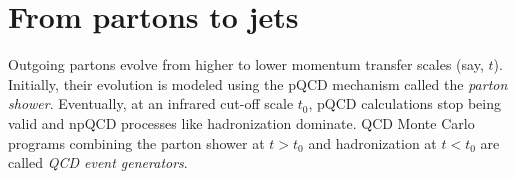 \section{From partons to jets}
\label{sec:partonShower}
Outgoing partons evolve from higher to lower momentum transfer scales (say, \(t\)). Initially, their evolution is modeled using the pQCD mechanism called the \emph{parton shower}. Eventually, at an infrared cut-off scale \(t_0\), pQCD calculations stop being valid and npQCD processes like hadronization dominate. QCD Monte Carlo programs combining the parton shower at \(t > t_0\) and hadronization at \(t < t_0\) are called \emph{QCD event generators}.


